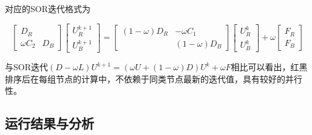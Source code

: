 \documentclass{article}
\begin{document}
对应的SOR迭代格式为

$$\left[\begin{matrix}
D_{R} & \\
\omega C_{2} & D_{B}
\end{matrix}\right]
\left[\begin{matrix}
U_{R}^{k+1}\\
U_{B}^{k+1}
\end{matrix}\right]=
\left[\begin{matrix}
(1-\omega)D_{R} & -\omega C_{1}\\
& (1-\omega)D_{B}
\end{matrix}\right]
\left[\begin{matrix}
U_{R}^{k}\\
U_{B}^{k}
\end{matrix}\right]+
\omega
\left[\begin{matrix}
F_{R}\\
F_{B}
\end{matrix}\right]$$

与SOR迭代$(D-\omega L)U^{k+1}=(\omega U+(1-\omega)D)U^{k}+\omega F$相比可以看出，红黑排序后在每组节点的计算中，不依赖于同类节点最新的迭代值，具有较好的并行性。


\subsection{运行结果与分析}
\end{document}
